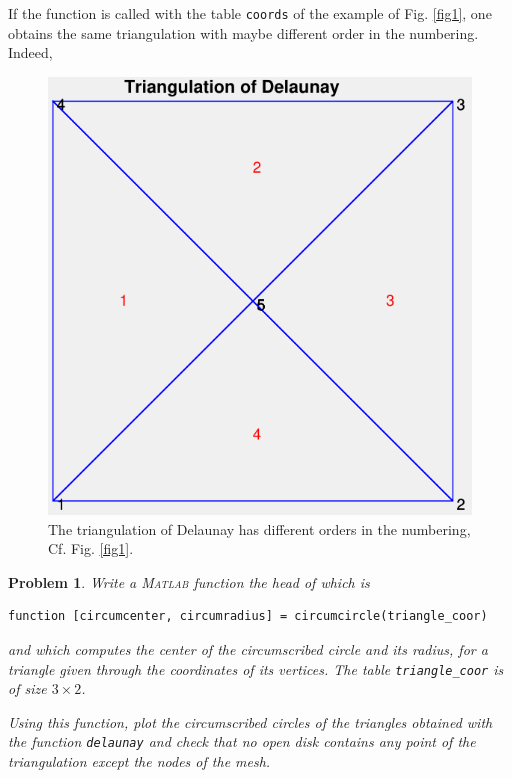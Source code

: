 \documentclass[11pt,a4paper,center,notitlepage]{article}
\numberwithin{equation}{section}
\newtheorem{prob}{Problem}[section]
\begin{document}
If the function is called with the table \texttt{coords} of the example of Fig. \ref{fig1}, one obtains the same triangulation with maybe different order in the numbering. Indeed,
\begin{figure}[H]
\centering
\includegraphics[scale=0.9]{8}
\caption{The triangulation of Delaunay has different orders in the numbering, Cf. Fig. \ref{fig1}.}
\label{fig8}
\end{figure}

\begin{prob}\label{prob2.1}
Write a \textsc{Matlab} function the head of which is
\begin{verbatim}
function [circumcenter, circumradius] = circumcircle(triangle_coor)
\end{verbatim}
and which computes the center of the circumscribed circle and its radius, for a triangle given through the coordinates of its vertices. The table \verb|triangle_coor| is of size $3\times 2$.

Using this function, plot the circumscribed circles of the triangles obtained with the function \verb|delaunay| and check that no open disk contains any point of the triangulation except the nodes of the mesh.
\end{prob}
\end{document}

